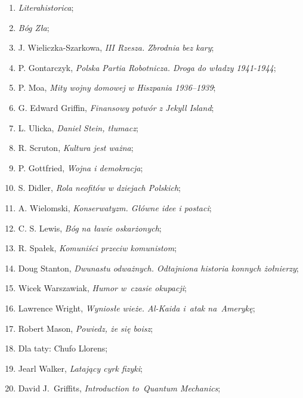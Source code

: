 \documentclass[a4paper,11pt]{article}
\begin{document}
\begin{enumerate}
\item \emph{Literahistorica};

\item \emph{Bóg Zła};

\item J. Wieliczka-Szarkowa, \emph{III Rzesza. Zbrodnia bez kary};

\item P. Gontarczyk, \emph{Polska Partia Robotnicza. Droga do władzy
    1941-1944};

\item P. Moa, \emph{Mity wojny domowej w Hiszpania 1936--1939};

\item G. Edward Griffin, \emph{Finansowy potwór z Jekyll Island};

\item L. Ulicka, \emph{Daniel Stein, tłumacz};

\item R. Scruton, \emph{Kultura jest ważna};

\item P. Gottfried, \emph{Wojna i demokracja};

\item S. Didler, \emph{Rola neofitów w dziejach Polskich};

\item A. Wielomski, \emph{Konserwatyzm. Główne idee i postaci};

\item C. S. Lewis, \emph{Bóg na ławie oskarżonych};

\item R. Spałek, \emph{Komuniści przeciw komunistom};

\item Doug Stanton, \emph{Dwunastu odważnych. Odtajniona historia
    konnych żołnierzy};

\item Wicek Warszawiak, \emph{Humor w~czasie okupacji};

\item Lawrence Wright, \emph{Wyniosłe wieże. Al-Kaida i~atak
    na~Amerykę};

\item Robert Mason, \emph{Powiedz, że się boisz};

\item Dla taty: Chufo Llorens;

\item Jearl Walker, \emph{Latający cyrk fizyki};

\item David J.~Griffits, \emph{Introduction to~Quantum Mechanics};


\end{enumerate}
\end{document}
